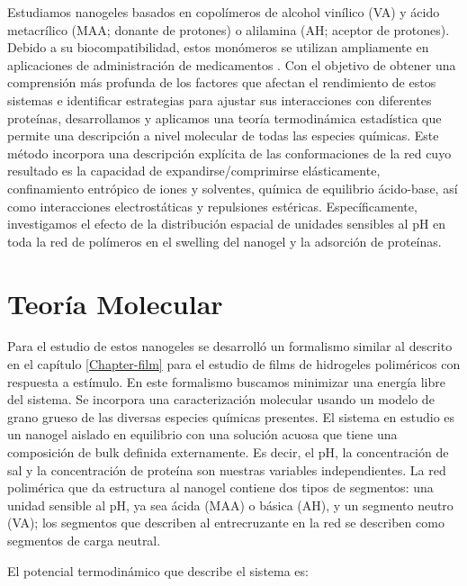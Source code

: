 Estudiamos nanogeles basados en copol\'imeros de alcohol vin\'ilico (VA) y \'acido metacr\'ilico (MAA; donante de protones) o alilamina (AH; aceptor de protones).
Debido a su biocompatibilidad, estos mon\'omeros se utilizan ampliamente en aplicaciones de administraci\'on de medicamentos \cite{asadi2020common,sarwar2020smart,lowman1999oral}.
Con el objetivo de obtener una comprensi\'on m\'as profunda de los factores que afectan el rendimiento de estos sistemas e identificar estrategias para ajustar sus interacciones con diferentes prote\'inas, desarrollamos y aplicamos una teor\'ia termodin\'amica estad\'istica que permite una descripci\'on a nivel molecular de todas las especies qu\'imicas.
Este m\'etodo incorpora una descripci\'on expl\'icita de las conformaciones de la red cuyo resultado es la capacidad de expandirse/comprimirse el\'asticamente, confinamiento entr\'opico de iones y solventes, qu\'imica de equilibrio \'acido-base, as\'i como interacciones electrost\'aticas y repulsiones est\'ericas.
Espec\'ificamente, investigamos el efecto de la distribuci\'on espacial de unidades sensibles al pH en toda la red de pol\'imeros en el swelling del nanogel y la adsorci\'on de prote\'inas.



\section{Teor\'ia Molecular}
Para el estudio de estos nanogeles se desarroll\'o un formalismo similar al descrito en el cap\'itulo \ref{Chapter-film} para el estudio de films de hidrogeles polim\'ericos con respuesta a est\'imulo.
En este formalismo  buscamos minimizar una energ\'ia libre del sistema. Se incorpora una caracterizaci\'on molecular usando un modelo de grano grueso de las diversas especies qu\'imicas presentes.
El sistema en estudio es un nanogel aislado en equilibrio con una soluci\'on acuosa que tiene una composici\'on de bulk definida externamente.
Es decir, el pH, la concentraci\'on de sal y la concentraci\'on de prote\'ina son nuestras variables independientes.
La red polim\'erica que da estructura al nanogel contiene dos tipos de segmentos: una unidad sensible al pH, ya sea \'acida (MAA) o b\'asica (AH), y un segmento neutro (VA);
los segmentos que describen al entrecruzante en la red se describen como segmentos de carga neutral.

El potencial termodin\'amico que describe el sistema es:

